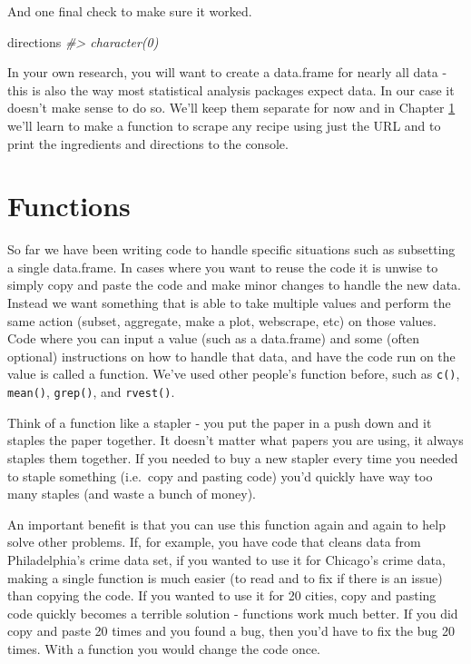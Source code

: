 \documentclass[
  12pt,
]{book}
\newenvironment{Shaded}{\begin{snugshade}}{\end{snugshade}}
\newcommand{\CommentTok}[1]{\textcolor[rgb]{0.56,0.35,0.01}{\textit{#1}}}
\newcommand{\NormalTok}[1]{#1}
\begin{document}
And one final check to make sure it worked.

\begin{Shaded}
\begin{Highlighting}[]
\NormalTok{directions}
\CommentTok{\#> character(0)}
\end{Highlighting}
\end{Shaded}

In your own research, you will want to create a data.frame for nearly all data - this is also the way most statistical analysis packages expect data. In our case it doesn't make sense to do so. We'll keep them separate for now and in Chapter \ref{functions} we'll learn to make a function to scrape any recipe using just the URL and to print the ingredients and directions to the console.

\hypertarget{functions}{%
\chapter{Functions}\label{functions}}

So far we have been writing code to handle specific situations such as subsetting a single data.frame. In cases where you want to reuse the code it is unwise to simply copy and paste the code and make minor changes to handle the new data. Instead we want something that is able to take multiple values and perform the same action (subset, aggregate, make a plot, webscrape, etc) on those values. Code where you can input a value (such as a data.frame) and some (often optional) instructions on how to handle that data, and have the code run on the value is called a function. We've used other people's function before, such as \texttt{c()}, \texttt{mean()}, \texttt{grep()}, and \texttt{rvest()}.

Think of a function like a stapler - you put the paper in a push down and it staples the paper together. It doesn't matter what papers you are using, it always staples them together. If you needed to buy a new stapler every time you needed to staple something (i.e.~copy and pasting code) you'd quickly have way too many staples (and waste a bunch of money).

An important benefit is that you can use this function again and again to help solve other problems. If, for example, you have code that cleans data from Philadelphia's crime data set, if you wanted to use it for Chicago's crime data, making a single function is much easier (to read and to fix if there is an issue) than copying the code. If you wanted to use it for 20 cities, copy and pasting code quickly becomes a terrible solution - functions work much better. If you did copy and paste 20 times and you found a bug, then you'd have to fix the bug 20 times. With a function you would change the code once.
\end{document}
